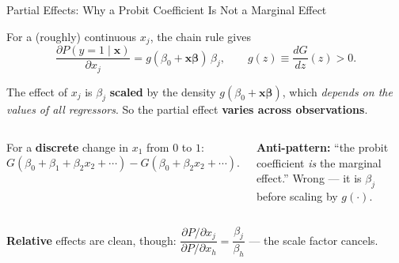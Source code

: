 \documentclass[aspectratio=169, 12pt]{beamer}
\newcommand{\xbeta}{\mathbf{x}\boldsymbol{\beta}}   %
\begin{document}
\begin{frame}[shrink=10]{Partial Effects: Why a Probit Coefficient Is Not a Marginal Effect}

  For a (roughly) continuous $x_j$, the chain rule gives
  \[
    \frac{\partial P(y=1\mid\mathbf{x})}{\partial x_j}
      = g(\beta_0 + \xbeta)\,\beta_j, \qquad g(z) \equiv \frac{dG}{dz}(z) > 0 .
  \]

  \begin{highlightbox}
    The effect of $x_j$ is $\beta_j$ \textbf{scaled} by the density $g(\beta_0+\xbeta)$,
    which \emph{depends on the values of all regressors}. So the partial effect
    \textbf{varies across observations}.
  \end{highlightbox}

  \smallskip

  \begin{columns}[t]
    For a \textbf{discrete} change in $x_1$ from $0$ to $1$:
    \[
      G(\beta_0+\beta_1+\beta_2 x_2 + \cdots) - G(\beta_0+\beta_2 x_2 + \cdots).
    \]
    \begin{keybox}
      \small
      \textbf{Anti-pattern:} ``the probit coefficient \emph{is} the marginal
      effect.'' \textcolor{negative}{Wrong} --- it is $\beta_j$ before scaling by
      $g(\cdot)$.
    \end{keybox}
  \end{columns}

  \smallskip

  \textbf{Relative} effects are clean, though:
  $\dfrac{\partial P/\partial x_j}{\partial P/\partial x_h} = \dfrac{\beta_j}{\beta_h}$
  --- the scale factor cancels.

\end{frame}
\end{document}
